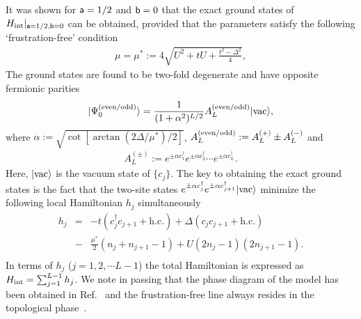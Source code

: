 \documentclass[aps, prb, showpacs, twocolumn, %
amssymb,superscriptaddress]{revtex4}
\def\dag{\dagger}
\begin{document}
It was shown for ${\sf a}=1/2$ and ${\sf b}=0$ that the exact ground states of $H_{\rm{int}}|_{{\sf a}=1/2, {\sf b}=0}$ can be obtained, provided that the parameters satisfy the following `frustration-free' condition~\cite{Katsura_Int_Majorana}
\begin{eqnarray}
\mu = \mu^{*} := 4\sqrt{U^2+tU+\frac{t^2-\Delta^2}{4}},
	\label{frus_free}
\end{eqnarray}
The ground states are found to be two-fold degenerate and have opposite fermionic parities
\begin{eqnarray}
\lvert\Psi^{\rm{(even/odd)}}_0\rangle=\frac{1}{(1+\alpha^2)^{L/2}}A_L^{\rm{(even/odd)}}\lvert\mathrm{vac}\rangle,
\end{eqnarray}
where $\alpha := \sqrt{\cot \left[ \arctan \left( 2\Delta/\mu^{*} \right)/2 \right]}$, $A_{L}^{\rm{(even/odd)}} := A_{L}^{(+)} \pm A_{L}^{(-)}$ and
\begin{eqnarray}
A_{L}^{(\pm)} := 
e^{\pm\alpha c^{\dag}_{1}} e^{\pm\alpha c^{\dag}_{2}} \cdots  e^{\pm\alpha c^{\dag}_{L}}.
\end{eqnarray}
Here, $|\rm{vac}\rangle$ is the vacuum state of $\{c_j\}$. 
The key to obtaining the exact ground states is the fact that the two-site states $e^{\pm\alpha c^\dag_j}e^{\pm\alpha c^\dag_{j+1}}|\rm{vac}\rangle$ 
minimize the following local Hamiltonian $h_{j}$ simultaneously 
\begin{eqnarray}
h_{j} &=&
-t \left( c^{\dag}_{j} c_{j+1} + \mathrm{h.c.} \right) + \Delta \left( c_{j} c_{j+1} + \mathrm{h.c.} \right) \nonumber\\
&-& \frac{\mu^{*}}{2} \left( n_{j} + n_{j+1}-1 \right) + U \left( 2n_{j}-1 \right) \left( 2n_{j+1}-1 \right). \nonumber \\
\end{eqnarray}
In terms of $h_j$ ($j=1,2,\cdots L-1$) the total Hamiltonian is expressed as $H_{\rm int}=\sum^{L-1}_{j=1} h_j$. We note in passing that the phase diagram of the model has been obtained in Ref.~ and the frustration-free line always resides in the topological phase~\cite{Katsura_Int_Majorana}. 
\end{document}
